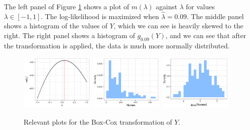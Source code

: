 \documentclass[10pt]{article}
\begin{document}
\begin{itemize}
    The left panel of Figure \ref{q01-box-cox} shows a plot of \(m(\lambda)\) against \(\lambda\) for values \(\lambda \in [-1, 1]\). The log-likelihood is maximized when \(\hat{\lambda} = 0.09\).
    The middle panel shows a histogram of the values of \(Y\), which we can see is heavily skewed to the right. The right panel shows a histogram of \(g_{0.09}(Y)\), and we can see that 
    after the transformation is applied, the data is much more normally distributed. 
    \begin{figure}
        \centering
        \includegraphics[width = 0.32\textwidth]{img/q01-box-cox-lambda.png}
        \includegraphics[width = 0.32\textwidth]{img/q01-nurses-hist-original.png}
        \includegraphics[width = 0.32\textwidth]{img/q01-nurses-hist-transformed.png}
        \caption{Relevant plots for the Box-Cox transformation of \(Y\).}
        \label{q01-box-cox}
    \end{figure}
\end{itemize}
\end{document}
